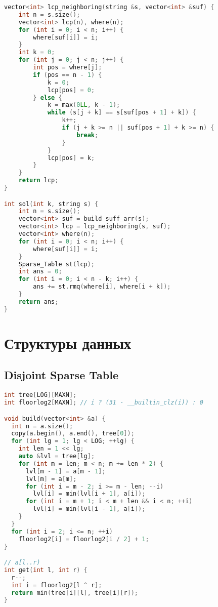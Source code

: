 \documentclass[10pt,a4paper,landscape,twosided]{extarticle}
\begin{document}
\begin{multicols*}{3}
\begin{lstlisting}[language=C++]
vector<int> lcp_neighboring(string &s, vector<int> &suf) {
    int n = s.size();
    vector<int> lcp(n), where(n);
    for (int i = 0; i < n; i++) {
        where[suf[i]] = i;
    }
    int k = 0;
    for (int j = 0; j < n; j++) {
        int pos = where[j];
        if (pos == n - 1) {
            k = 0;
            lcp[pos] = 0;
        } else {
            k = max(0LL, k - 1);
            while (s[j + k] == s[suf[pos + 1] + k]) {
                k++;
                if (j + k >= n || suf[pos + 1] + k >= n) {
                    break;
                }
            }
            lcp[pos] = k;
        }
    }
    return lcp;
}

int sol(int k, string s) {
    int n = s.size();
    vector<int> suf = build_suff_arr(s);
    vector<int> lcp = lcp_neighboring(s, suf);
    vector<int> where(n);
    for (int i = 0; i < n; i++) {
        where[suf[i]] = i;
    }
    Sparse_Table st(lcp);
    int ans = 0;
    for (int i = 0; i < n - k; i++) {
        ans += st.rmq(where[i], where[i + k]);
    }
    return ans;
}

\end{lstlisting}

\section{Структуры данных}

\subsection{Disjoint Sparse Table}
\begin{lstlisting}[language=C++]
int tree[LOG][MAXN];
int floorlog2[MAXN]; // i ? (31 - __builtin_clz(i)) : 0

void build(vector<int> &a) {
  int n = a.size();
  copy(a.begin(), a.end(), tree[0]);
  for (int lg = 1; lg < LOG; ++lg) {
    int len = 1 << lg;
    auto &lvl = tree[lg];
    for (int m = len; m < n; m += len * 2) {
      lvl[m - 1] = a[m - 1];
      lvl[m] = a[m];
      for (int i = m - 2; i >= m - len; --i)
        lvl[i] = min(lvl[i + 1], a[i]);
      for (int i = m + 1; i < m + len && i < n; ++i)
        lvl[i] = min(lvl[i - 1], a[i]);
    }
  }
  for (int i = 2; i <= n; ++i)
    floorlog2[i] = floorlog2[i / 2] + 1;
}

// a[l..r)
int get(int l, int r) {
  r--;
  int i = floorlog2[l ^ r];
  return min(tree[i][l], tree[i][r]);
}

\end{lstlisting}


\end{multicols*}
\end{document}
